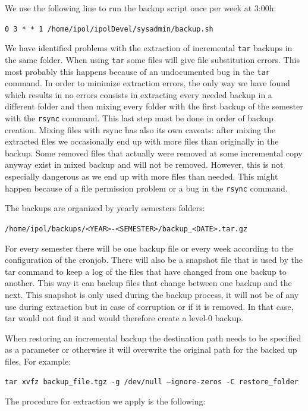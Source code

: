 \documentclass[a4paper,12pt]{article}
\begin{document}
We use the following line to run the backup script once per week at 3:00h:

{\tt 0 3 * * 1 /home/ipol/ipolDevel/sysadmin/backup.sh}

We have identified problems with the extraction of incremental {\tt tar} backups in the same folder. When using {\tt tar} some files will give file substitution errors. This most probably this happens because of an undocumented bug in the {\tt tar} command. In order to minimize extraction errors, the only way we have found which results in no errors consists in extracting every needed backup in a different folder and then mixing every folder with the first backup of the semester with the {\tt rsync} command. This last step must be done in order of backup creation. Mixing files with rsync has also its own caveats: after mixing the extracted files we occasionally end up with more files than originally in the backup. Some removed files that actually were removed at some incremental copy anyway exist in mixed backup and will not be removed. However, this is not especially dangerous as we end up with more files than needed. This might happen because of a file permission problem or a bug in the {\tt rsync} command.

The backups are organized by yearly semesters folders:

{\tt /home/ipol/backups/<YEAR>-<SEMESTER>/backup\_<DATE>.tar.gz}

For every semester there will be one backup file or every week according to the configuration of the cronjob. There will also be a snapshot file that is used by the tar command to keep a log of the files that have changed from one backup to another. This way it can backup files that change between one backup and the next. This snapshot is only used during the backup process, it will not be of any use during extraction but in case of corruption or if it is removed. In that case, tar would not find it and would therefore create a level-0 backup. 

When restoring an incremental backup the destination path needs to be specified as a parameter or otherwise it will overwrite the original path for the backed up files. For example:

{\tt tar xvfz backup\_file.tgz -g /dev/null --ignore-zeros -C restore\_folder}

The procedure for extraction we apply is the following:
\end{document}
